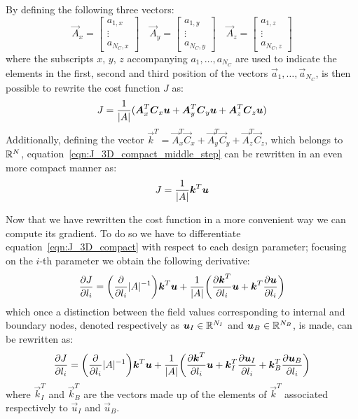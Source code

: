 By defining the following three vectors:
\begin{equation}
	\vec{A}_x =
	\begin{bmatrix}
		a_{1,x}   \\
		\vdots			\\
		a_{N_C,x}
	\end{bmatrix} \quad
	\vec{A}_y =
	\begin{bmatrix}
		a_{1,y}   \\
		\vdots			\\
		a_{N_C,y}
	\end{bmatrix} \quad
	\vec{A}_z =
	\begin{bmatrix}
		a_{1,z}   \\
		\vdots			\\
		a_{N_C,z}
	\end{bmatrix}
\end{equation}
where the subscripts $x$, $y$, $z$ accompanying $a_1, \dots, a_{N_C}$ are used to indicate the elements in the first, second and third position of the vectors $\vec{a}_1, \dots, \vec{a}_{N_C}$, is then possible to rewrite the cost function $J$ as:
\begin{equation}
	\label{eqn:J_3D_compact_middle_step}
	J = \frac{1}{\lvert A\rvert} ( \boldsymbol{A}_x^T \boldsymbol{C}_x \boldsymbol{u} + \boldsymbol{A}_y^T \boldsymbol{C}_y \boldsymbol{u} + \boldsymbol{A}_z^T \boldsymbol{C}_z \boldsymbol{u})
\end{equation}
Additionally, defining the vector $\vec{k}^T = \vec{A}_x^T \vec{C}_x + \vec{A}_y^T \vec{C}_y + \vec{A}_z^T \vec{C}_z$, which belongs to $\mathbb{R}^{N}$, equation~\eqref{eqn:J_3D_compact_middle_step} can be rewritten in an even more compact manner as:
\begin{equation}
	\label{eqn:J_3D_compact}
	J = \frac{1}{\lvert A\rvert} \boldsymbol{k}^T \boldsymbol{u}
\end{equation}

\smallskip
Now that we have rewritten the cost function in a more convenient way we can compute its gradient. To do so we have to differentiate equation~\eqref{eqn:J_3D_compact} with respect to each design parameter; focusing on the $i$-th parameter we obtain the following derivative:
\begin{equation}
	\label{eqn:diff_J_3D_single_param_mid_step}
	\frac{\partial J}{\partial l_i} = \biggl( \frac{\partial}{\partial l_i} \lvert A\rvert^{-1} \biggr) \boldsymbol{k}^T \boldsymbol{u} + \frac{1}{\lvert A\rvert} \biggl( \frac{\partial \boldsymbol{k}^T}{\partial l_i}\boldsymbol{u} + \boldsymbol{k}^T \frac{\partial \boldsymbol{u}}{\partial l_i} \biggr)
\end{equation}
which once a distinction between the field values corresponding to internal and boundary nodes, denoted respectively as $\boldsymbol{u}_I \in \mathbb{R}^{N_I}$ and $\boldsymbol{u}_B \in \mathbb{R}^{N_B}$, is made, can be rewritten as:
\begin{equation}
	\frac{\partial J}{\partial l_i} = \biggl( \frac{\partial}{\partial l_i} \lvert A\rvert^{-1} \biggr) \boldsymbol{k}^T \boldsymbol{u} + \frac{1}{\lvert A\rvert} \biggl( \frac{\partial \boldsymbol{k}^T}{\partial l_i}\boldsymbol{u} + \boldsymbol{k}_I^T \frac{\partial \boldsymbol{u}_I}{\partial l_i} + \boldsymbol{k}_B^T \frac{\partial \boldsymbol{u}_B}{\partial l_i}\biggr)
\end{equation}
where $\vec{k}_I^T$ and $\vec{k}_B^T$ are the vectors made up of the elements of $\vec{k}^T$ associated respectively to $\vec{u}_I$ and $\vec{u}_B$.

